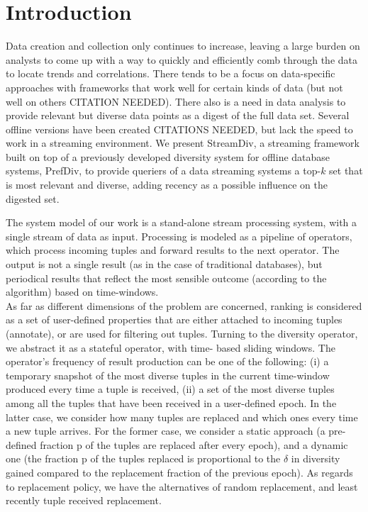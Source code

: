 \section{Introduction}

Data creation and collection only continues to increase, leaving a large burden on analysts to come up with a way to quickly and efficiently comb through the data to locate trends and correlations.  There tends to be a focus on data-specific approaches with frameworks that work well for certain kinds of data (but not well on others CITATION NEEDED).  There also is a need in data analysis to provide relevant but diverse data points as a digest of the full data set.  Several offline versions have been created \cite{Ge:2015:PD:2795218.2795224} CITATIONS NEEDED, but lack the speed to work in a streaming environment.  We present StreamDiv, a streaming framework built on top of a previously developed diversity system for offline database systems, PrefDiv\cite{Ge:2015:PD:2795218.2795224}, to provide queriers of a data streaming systems a top-$k$ set that is most relevant and diverse, adding recency as a possible influence on the digested set.

The system
model of our work is a stand-alone stream processing system, with a single
stream of data as input. Processing is modeled as a pipeline of operators,
which process incoming tuples and forward results to the next operator.
The output is not a single result (as in the case of traditional databases),
but periodical results that reflect the most sensible outcome (according
to the algorithm) based on time-windows.\\

\indent As far as different dimensions of the problem are concerned, ranking is
considered as a set of user-defined properties that are either attached to
incoming tuples (annotate), or are used for filtering out tuples. Turning
to the diversity operator, we abstract it as a stateful operator, with time-
based sliding windows. The operator's frequency of result production
can be one of the following: (i) a temporary snapshot of the most diverse
tuples in the current time-window produced every time a tuple is received,
(ii) a set of the most diverse tuples among all the tuples that have been
received in a user-defined epoch. In the latter case, we consider how
many tuples are replaced and which ones every time a new tuple arrives.
For the former case, we consider a static approach (a pre-defined fraction
p of the tuples are replaced after every epoch), and a dynamic one (the
fraction p of the tuples replaced is proportional to the $\delta$ in diversity gained
compared to the replacement fraction of the previous epoch). As regards
to replacement policy, we have the alternatives of random replacement,
and least recently tuple received replacement.